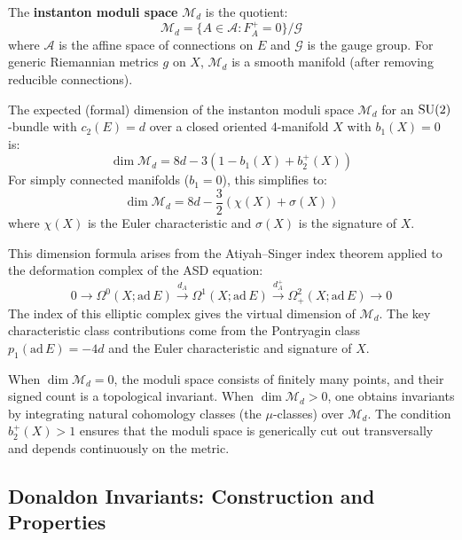 \begin{definition}
The \textbf{instanton moduli space} $\mathcal{M}_d$ is the quotient:
\[
\mathcal{M}_d = \{ A \in \mathcal{A} : F_A^+ = 0 \} / \mathcal{G}
\]
where $\mathcal{A}$ is the affine space of connections on $E$ and $\mathcal{G}$ is the gauge group. For generic Riemannian metrics $g$ on $X$, $\mathcal{M}_d$ is a smooth manifold (after removing reducible connections).
\end{definition}

\begin{theorem}
The expected (formal) dimension of the instanton moduli space $\mathcal{M}_d$ for an $\operatorname{SU}(2)$-bundle with $c_2(E) = d$ over a closed oriented 4-manifold $X$ with $b_1(X) = 0$ is:
\[
\dim \mathcal{M}_d = 8d - 3(1 - b_1(X) + b_2^+(X))
\]
For simply connected manifolds ($b_1 = 0$), this simplifies to:
\[
\dim \mathcal{M}_d = 8d - \frac{3}{2}(\chi(X) + \sigma(X))
\]
where $\chi(X)$ is the Euler characteristic and $\sigma(X)$ is the signature of $X$.
\end{theorem}

\begin{remark}
This dimension formula arises from the Atiyah--Singer index theorem applied to the deformation complex of the ASD equation:
\[
0 \to \Omega^0(X; \mathrm{ad}\, E) \xrightarrow{d_A} \Omega^1(X; \mathrm{ad}\, E) \xrightarrow{d_A^+} \Omega^2_+(X; \mathrm{ad}\, E) \to 0
\]
The index of this elliptic complex gives the virtual dimension of $\mathcal{M}_d$. The key characteristic class contributions come from the Pontryagin class $p_1(\mathrm{ad}\, E) = -4d$ and the Euler characteristic and signature of $X$.
\end{remark}

\begin{remark}
When $\dim \mathcal{M}_d = 0$, the moduli space consists of finitely many points, and their signed count is a topological invariant. When $\dim \mathcal{M}_d > 0$, one obtains invariants by integrating natural cohomology classes (the $\mu$-classes) over $\mathcal{M}_d$. The condition $b_2^+(X) > 1$ ensures that the moduli space is generically cut out transversally and depends continuously on the metric.
\end{remark}

\subsection{Donaldon Invariants: Construction and Properties}

